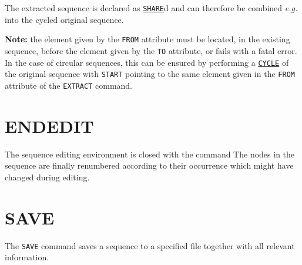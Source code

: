 The extracted sequence is declared as \hyperref[chap:sequence]{\texttt{SHARE}}d and
can therefore be combined \textsl{e.g.} into the cycled original sequence.

\textbf{Note:} the element given by the \texttt{FROM} attribute must be
located, in the existing sequence, before the element given by the
\texttt{TO} attribute, or \madx fails with a fatal error. 
In the case of circular sequences, this can be ensured by performing a 
\hyperref[sec:cycle]{\texttt{CYCLE}} of the original sequence with
\texttt{START} pointing to the same element given in the \texttt{FROM}
attribute of the \texttt{EXTRACT} command. 


\section{ENDEDIT}
\label{sec:endedit}
The sequence editing environment is closed with the command
The nodes in the sequence are finally renumbered according to their occurrence 
which might have changed during editing.




\section{SAVE}
\label{sec:save}

The \texttt{SAVE} command saves a sequence to a specified file together with all 
relevant information.


